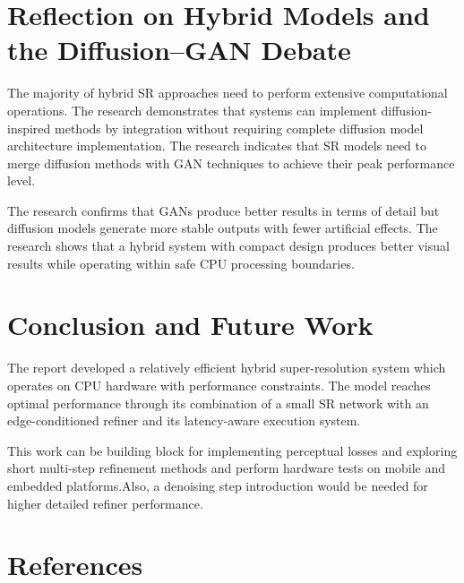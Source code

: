 \documentclass[conference]{IEEEtran}
\begin{document}
\section{Reflection on Hybrid Models and the Diffusion--GAN Debate}

The majority of hybrid SR approaches need to perform extensive computational operations. The research demonstrates that systems can implement diffusion-inspired methods by integration without requiring complete diffusion model architecture implementation. The research indicates that SR models need to merge diffusion methods with GAN techniques to achieve their peak performance level.

The research confirms that GANs produce better results in terms of detail but diffusion models generate more stable outputs with fewer artificial effects. The research shows that a hybrid system with compact design produces better visual results while operating within safe CPU processing boundaries.

\section{Conclusion and Future Work}
The report developed a relatively efficient hybrid super-resolution system which operates on CPU hardware with performance constraints. The model reaches optimal performance through its combination of a small SR network with an edge-conditioned refiner and its latency-aware execution system.

This work can be building block for implementing perceptual losses and exploring short multi-step refinement methods and perform hardware tests on mobile and embedded platforms.Also, a denoising step introduction would be needed for higher detailed refiner performance.

\section{References}
\end{document}
